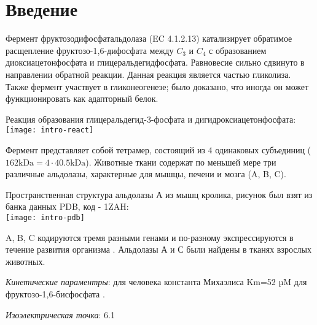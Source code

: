 \section{Введение}
Фермент фруктозодифосфатальдолаза (EC 4.1.2.13) катализирует обратимое расщепление
фруктозо-1,6-дифосфата между $C_3$ и $C_4$ с образованием диоксиацетонфосфата и глицеральдегидфосфата.
Равновесие сильно сдвинуто в направлении обратной реакции.
Данная реакция является частью гликолиза. Также фермент участвует в гликонеогенезе;
было доказано, что иногда он может функционировать как адапторный белок.

Реакция образования глицеральдегид-3-фосфата и дигидроксиацетонфосфата:\\
\texttt{[image: intro-react]}

\label{lit-m}
Фермент представляет собой тетрамер, состоящий из 4 одинаковых субъединиц
($ 162 \text{kDa} = 4 \cdot 40.5 \text{kDa} $).
Животные ткани содержат по меньшей мере три различные альдолазы, характерные для
мышцы, печени и мозга (A, B, C).

Пространственная структура альдолазы А из мышц кролика, рисунок был взят из банка данных PDB, код - 1ZAH:\\
\texttt{[image: intro-pdb]}

A, B, C кодируются тремя разными генами и по-разному экспрессируются в течение развития организма
\cite{ABC} \cite{ABC-1}.
Альдолазы А и С были найдены в тканях взрослых животных.

\emph{Кинетические параментры}: для человека константа Михаэлиса Km=52 µM для фруктозо-1,6-бисфосфата
\cite{uniprot-human}.

\emph{Изоэлектрическая точка}: 6.1 \cite{pI}

